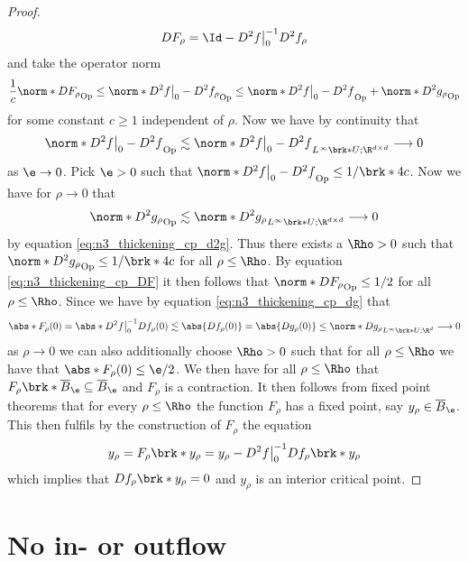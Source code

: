 \begin{proof}
\begin{align*}
    DF_\rho=\Id -D^2f\big\vert_0^{-1}D^2f_\rho
  \end{align*}
  and take the operator norm
  \begin{align}
    \frac{1}{c}\norm*{DF_\rho}_{\text{Op}}\leq\norm*{D^2f\big\vert_0-D^2f_\rho}_{\text{Op}}
    \leq \norm*{D^2f\big\vert_0-D^2f}_{\text{Op}}+\norm*{D^2g_\rho}_{\text{Op}}
    \label{eq:n3_thickening_cp_DF}
  \end{align}
  for some constant $c\geq1$ independent of $\rho$.
  Now we have by continuity that
  $$\norm*{D^2f\big\vert_0-D^2f}_{\text{Op}}\lesssim \norm*{D^2f\big\vert_0-D^2f}_{L^\infty\brk*{U;\R^{d\times d}}}\longrightarrow0$$
  as $\e\to0$.
  Pick $\e>0$ such that $\norm*{D^2f\big\vert_0-D^2f}_{\text{Op}}\leq 1/\brk*{4c}$.
  Now we have for $\rho\to0$ that 
  $$\norm*{D^2g_\rho}_{\text{Op}}\lesssim\norm*{D^2g_\rho}_{L^\infty\brk*{U;\R^{d\times d}}}\longrightarrow0$$
  by equation
  \eqref{eq:n3_thickening_cp_d2g}. Thus there exists a $\Rho>0$ such that $\norm*{D^2g_\rho}_{\text{Op}}\leq1/\brk*{4c}$
  for all $\rho\leq\Rho$.
  By equation \eqref{eq:n3_thickening_cp_DF} it then follows that
  $\norm*{DF_\rho}_{\text{Op}}\leq 1/2$
  for all $\rho\leq\Rho$.
  Since we have by equation \eqref{eq:n3_thickening_cp_dg} that
  \begin{align*}
    \abs*{F_\rho(0)}=\abs*{D^2f\big\vert_0^{-1}Df_\rho(0)}
    \lesssim \abs{Df_\rho(0)}
    =\abs{Dg_\rho(0)}\leq\norm*{Dg_\rho}_{L^\infty\brk*{U;\R^d}}\longrightarrow0
  \end{align*}
  as $\rho\to0$ we can also additionally choose $\Rho>0$ such that for all $\rho\leq\Rho$ we have that
  $\abs*{F_\rho(0)}\leq \e/2$.
  We then have for all $\rho\leq\Rho$ that
  $F_\rho\brk*{\overline{B}_\e}\subseteq \overline{B}_\e$ and $F_\rho$ is a contraction.
  It then follows from fixed point theorems that for every $\rho\leq\Rho$
  the function $F_\rho$ has a fixed point, say $y_\rho\in \overline{B}_\e$. This then fulfils by the construction of $F_\rho$ the equation
  \begin{align*}
    y_\rho=F_\rho\brk*{y_\rho}=y_\rho-D^2f\big\vert_0^{-1}Df_\rho\brk*{y_\rho}
  \end{align*}
  which implies that $Df_\rho\brk*{y_\rho}=0$ and $y_\rho$ is an interior critical point.
\end{proof}



\chapter{No in- or outflow}
\label{ch:n2_hvf_noInflowNoOutflow}

